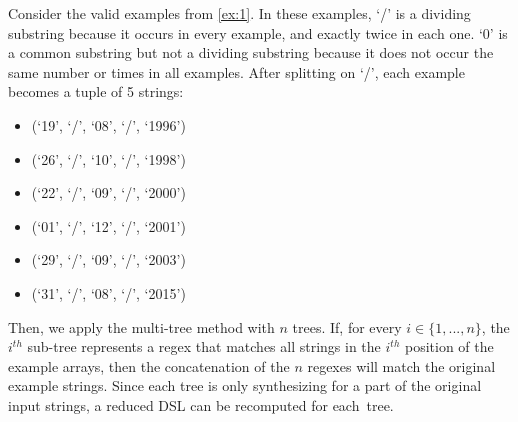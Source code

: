 \begin{example}\label{ex:splitting}
Consider the valid examples from \autoref{ex:1}.
%
In these examples, `/' is a dividing substring because it occurs in every example, and exactly twice in each one. `0' is a common substring but not a dividing substring because it does not occur the same number or times in all examples. After splitting on `/', each example becomes a tuple of 5 strings:

\begin{multicols}{3}
    \begin{itemize}[label={},topsep=0em,nosep]
    \item (`19', `/', `08', `/', `1996')
    \item (`26', `/', `10', `/', `1998')
    \item (`22', `/', `09', `/', `2000')
    \item (`01', `/', `12', `/', `2001')
    \item (`29', `/', `09', `/', `2003')
    \item (`31', `/', `08', `/', `2015')
    \end{itemize}
\end{multicols}
\end{example}
%
\noindent
Then, we apply the multi-tree method with \(n\) trees. If, for every \(i \in \{1, ..., n\}\), the \(i^{th}\) sub-tree represents a regex that matches all strings in the \(i^{th}\) position of the example arrays, then the concatenation of the \(n\) regexes will match the original example strings.
%
Since each tree is only synthesizing for a part of the original input strings, a reduced DSL can be recomputed for each~tree. %

